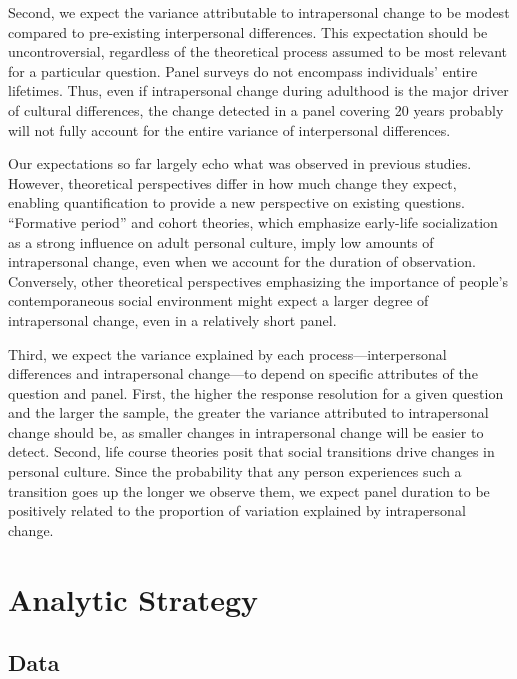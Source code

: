\documentclass[
  12pt,
]{article}
\begin{document}
Second, we expect the variance attributable to intrapersonal change to
be modest compared to pre-existing interpersonal differences. This
expectation should be uncontroversial, regardless of the theoretical
process assumed to be most relevant for a particular question. Panel
surveys do not encompass individuals' entire lifetimes. Thus, even if
intrapersonal change during adulthood is the major driver of cultural
differences, the change detected in a panel covering 20 years probably
will not fully account for the entire variance of interpersonal
differences.

Our expectations so far largely echo what was observed in previous
studies. However, theoretical perspectives differ in how much change
they expect, enabling quantification to provide a new perspective on
existing questions. ``Formative period'' and cohort theories, which
emphasize early-life socialization as a strong influence on adult
personal culture, imply low amounts of intrapersonal change, even when
we account for the duration of observation. Conversely, other
theoretical perspectives emphasizing the importance of people's
contemporaneous social environment might expect a larger degree of
intrapersonal change, even in a relatively short panel.

Third, we expect the variance explained by each process---interpersonal
differences and intrapersonal change---to depend on specific attributes
of the question and panel. First, the higher the response resolution for
a given question and the larger the sample, the greater the variance
attributed to intrapersonal change should be, as smaller changes in
intrapersonal change will be easier to detect. Second, life course
theories posit that social transitions drive changes in personal
culture. Since the probability that any person experiences such a
transition goes up the longer we observe them, we expect panel duration
to be positively related to the proportion of variation explained by
intrapersonal change.

\hypertarget{analytic-strategy}{%
\section{Analytic Strategy}\label{analytic-strategy}}

\hypertarget{data}{%
\subsection{Data}\label{data}}
\end{document}
